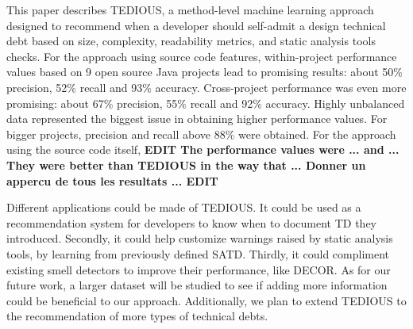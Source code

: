 
This paper describes \ac{TEDIOUS}, a method-level machine learning approach designed to recommend when a developer should self-admit a design technical debt based on size, complexity, readability metrics, and static analysis tools checks. For the approach using source code features, within-project performance values based on 9 open source Java projects lead to promising results: about 50\% precision, 52\% recall and 93\% accuracy. Cross-project performance was even more promising: about 67\% precision, 55\% recall and 92\% accuracy. Highly unbalanced data represented the biggest issue in obtaining higher performance values. For bigger projects, precision and recall above 88\% were obtained. For the approach using the source code itself, \textbf{EDIT The performance values were ... and ... They were better than \ac{TEDIOUS} in the way that ... Donner un appercu de tous les resultats ... EDIT} \par

Different applications could be made of \ac{TEDIOUS}. It could be used as a recommendation system for developers to know when to document \ac{TD} they introduced. Secondly, it could help customize warnings raised by static analysis tools, by learning from previously defined \ac{SATD}. Thirdly, it could compliment existing smell detectors to improve their performance, like \ac{DECOR}. As for our future work, a larger dataset will be studied to see if adding more information could be beneficial to our approach. Additionally, we plan to extend \ac{TEDIOUS} to the recommendation of more types of technical debts.






